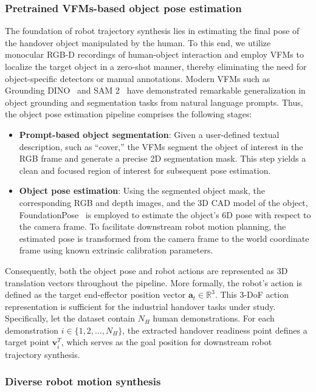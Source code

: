 \documentclass[final,5p,times,twocolumn]{elsarticle}
\begin{document}
\subsubsection{Pretrained VFMs-based object pose estimation}    \label{sec:3.2.1}
The foundation of robot trajectory synthesis lies in estimating the final pose of the handover object manipulated by the human. To this end, we utilize monocular RGB-D recordings of human-object interaction and employ VFMs to localize the target object in a zero-shot manner, thereby eliminating the need for object-specific detectors or manual annotations. Modern VFMs such as Grounding DINO~\cite{liu2024grounding} and SAM 2~\cite{ravi2024sam2} have demonstrated remarkable generalization in object grounding and segmentation tasks from natural language prompts. Thus, the object pose estimation pipeline comprises the following stages:
\begin{itemize}
    \item \textbf{Prompt-based object segmentation}: Given a user-defined textual description, such as “cover,” the VFMs segment the object of interest in the RGB frame and generate a precise 2D segmentation mask. This step yields a clean and focused region of interest for subsequent pose estimation.
    \item \textbf{Object pose estimation}: Using the segmented object mask, the corresponding RGB and depth images, and the 3D CAD model of the object, FoundationPose~\cite{wen2024foundationpose} is employed to estimate the object’s 6D pose with respect to the camera frame. To facilitate downstream robot motion planning, the estimated pose is transformed from the camera frame to the world coordinate frame using known extrinsic calibration parameters.
\end{itemize}

Consequently, both the object pose and robot actions are represented as 3D translation vectors throughout the pipeline. More formally, the robot's action is defined as the target end-effector position vector $\mathbf{a}_t \in \mathbb{R}^3$. This 3-DoF action representation is sufficient for the industrial handover tasks under study. Specifically, let the dataset contain $N_H$ human demonstrations. For each demonstration $i \in \{ 1, 2, \dots, N_H \} $, the extracted handover readiness point defines a target point $\mathbf{v}_i^T$, which serves as the goal position for downstream robot trajectory synthesis.



\subsubsection{Diverse robot motion synthesis} \label{sec:3.2.2}
\end{document}
